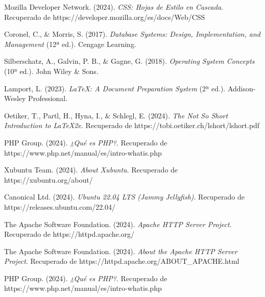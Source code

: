 \documentclass[12pt, letterpaper]{article}
\begin{document}
\begin{thebibliography}{99}
Mozilla Developer Network. (2024). \textit{CSS: Hojas de Estilo en Cascada}. Recuperado de https://developer.mozilla.org/es/docs/Web/CSS

Coronel, C., \& Morris, S. (2017). \textit{Database Systems: Design, Implementation, and Management} (12ª ed.). Cengage Learning.

Silberschatz, A., Galvin, P. B., \& Gagne, G. (2018). \textit{Operating System Concepts} (10ª ed.). John Wiley \& Sons.

Lamport, L. (2023). \textit{LaTeX: A Document Preparation System} (2ª ed.). Addison-Wesley Professional.

Oetiker, T., Partl, H., Hyna, I., \& Schlegl, E. (2024). \textit{The Not So Short Introduction to LaTeX2e}. Recuperado de https://tobi.oetiker.ch/lshort/lshort.pdf

PHP Group. (2024). \textit{¿Qué es PHP?}. Recuperado de https://www.php.net/manual/es/intro-whatis.php

Xubuntu Team. (2024). \textit{About Xubuntu}. Recuperado de https://xubuntu.org/about/

Canonical Ltd. (2024). \textit{Ubuntu 22.04 LTS (Jammy Jellyfish)}. Recuperado de https://releases.ubuntu.com/22.04/

The Apache Software Foundation. (2024). \textit{Apache HTTP Server Project}. Recuperado de https://httpd.apache.org/

The Apache Software Foundation. (2024). \textit{About the Apache HTTP Server Project}. Recuperado de https://httpd.apache.org/ABOUT\_APACHE.html

PHP Group. (2024). \textit{¿Qué es PHP?}. Recuperado de https://www.php.net/manual/es/intro-whatis.php

\end{thebibliography}

\end{document}
